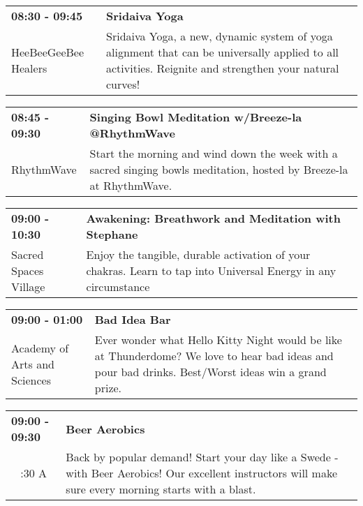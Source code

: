 \begin{tabular}{ p{1in} p{2.2in} }
    \textbf{08:30 - 09:45} & \textbf{Sridaiva Yoga} \\
    HeeBeeGeeBee Healers \newline  & Sridaiva Yoga, a new, dynamic system of yoga alignment that can be universally applied to all activities. Reignite and strengthen your natural curves! \\
    \hline 
\end{tabular}
    
\begin{tabular}{ p{1in} p{2.2in} }
    \textbf{08:45 - 09:30} & \textbf{Singing Bowl Meditation w/Breeze-la @RhythmWave} \\
    RhythmWave \newline  & Start the morning and wind down the week with a sacred singing bowls meditation, hosted by Breeze-la at RhythmWave. \\
    \hline 
\end{tabular}
    
\begin{tabular}{ p{1in} p{2.2in} }
    \textbf{09:00 - 10:30} & \textbf{Awakening: Breathwork and Meditation with Stephane} \\
    Sacred Spaces Village \newline  & Enjoy the tangible, durable activation of your chakras. Learn to tap into Universal Energy in any circumstance \\
    \hline 
\end{tabular}
    
\begin{tabular}{ p{1in} p{2.2in} }
    \textbf{09:00 - 01:00} & \textbf{Bad Idea Bar} \\
    Academy of Arts and Sciences \newline  & Ever wonder what Hello Kitty Night would be like at Thunderdome? We love to hear bad ideas and pour bad drinks. Best/Worst ideas win a grand prize. \\
    \hline 
\end{tabular}
    
\begin{tabular}{ p{1in} p{2.2in} }
    \textbf{09:00 - 09:30} & \textbf{Beer Aerobics} \\
    ~ \newline 4:30 A & Back by popular demand! Start your day like a Swede - with Beer Aerobics! Our excellent instructors will make sure every morning starts with a blast. \\
    \hline 
\end{tabular}
    

